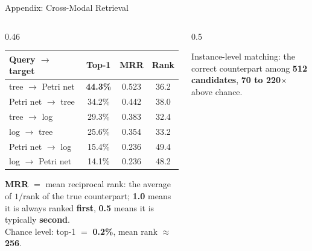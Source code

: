 \documentclass[aspectratio=169]{beamer}
\newcommand{\keyc}[1]{\textbf{\textcolor{procblue}{#1}}}
\newcommand{\keyg}[1]{\textbf{\textcolor{procgreen!70!black}{#1}}}
\newcommand{\keya}[1]{\textbf{\textcolor{procamber!85!black}{#1}}}
\begin{document}
\begin{frame}[fragile]{Appendix: Cross-Modal Retrieval}
  \begin{columns}[T]
  \begin{column}{0.46\textwidth}
    \vspace{2mm}
    \begin{center}
    \small
    \begin{tabular}{lccc}
      \toprule
      Query $\to$ target & Top-1 & MRR & Rank \\
      \midrule
      tree $\to$ Petri net & \keyc{44.3\%} & 0.523 & 36.2 \\
      Petri net $\to$ tree & 34.2\% & 0.442 & 38.0 \\
      tree $\to$ log & 29.3\% & 0.383 & 32.4 \\
      log $\to$ tree & 25.6\% & 0.354 & 33.2 \\
      Petri net $\to$ log  & 15.4\% & 0.236 & 49.4 \\
      log $\to$ Petri net  & 14.1\% & 0.236 & 48.2 \\
      \bottomrule
    \end{tabular}
    \end{center}
    \vspace{2mm}
    \small
    \keyc{MRR} $=$ mean reciprocal rank: the average of $1 / \mathrm{rank}$
    of the true counterpart; \keyc{1.0} means it is always ranked
    \keyg{first}, \keyc{0.5} means it is typically \keyg{second}.\\[2mm]
    Chance level: top-1 $=$ \keya{0.2\%}, mean rank $\approx$ \keya{256}.
  \end{column}
  \begin{column}{0.5\textwidth}
    \begin{center}
    \end{center}
    \small Instance-level matching: the correct counterpart among
    \keyc{512 candidates}, \keyg{70 to 220$\times$} above chance.
  \end{column}
  \end{columns}
\end{frame}
\end{document}
